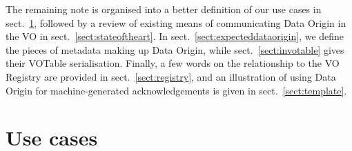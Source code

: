 \documentclass[11pt,a4paper]{ivoa}
\begin{document}
The remaining note is organised into a better definition of our use
cases in sect.~\ref{sect:usecases}, followed by a review of existing
means of communicating Data Origin in the VO in
sect.~\ref{sect:stateoftheart}.  In sect.~\ref{sect:expecteddataorigin},
we define the pieces of metadata making up Data Origin, while
sect.~\ref{sect:invotable} gives their VOTable serialisation.  Finally,
a few words on the relationship to the VO Registry are provided in
sect.~\ref{sect:registry}, and an illustration of using Data Origin for
machine-generated acknowledgements is given in
sect.~\ref{sect:template}.


\section{Use cases}
\label{sect:usecases}
\end{document}

